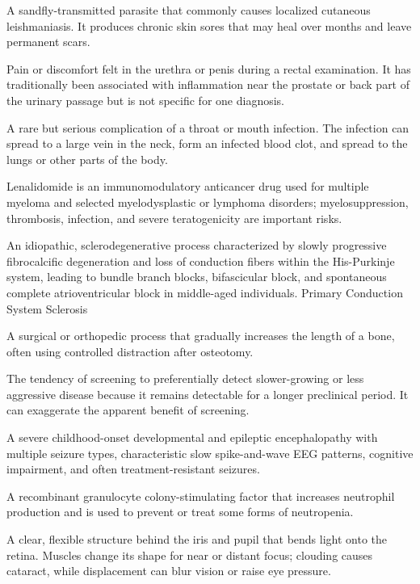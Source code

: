  A sandfly-transmitted parasite that commonly causes localized cutaneous leishmaniasis. It produces chronic skin sores that may heal over months and leave permanent scars.

 Pain or discomfort felt in the urethra or penis during a rectal examination. It has traditionally been associated with inflammation near the prostate or back part of the urinary passage but is not specific for one diagnosis.

 A rare but serious complication of a throat or mouth infection. The infection can spread to a large vein in the neck, form an infected blood clot, and spread to the lungs or other parts of the body.

 Lenalidomide is an immunomodulatory anticancer drug used for multiple myeloma and selected myelodysplastic or lymphoma disorders; myelosuppression, thrombosis, infection, and severe teratogenicity are important risks.

 An idiopathic, sclerodegenerative process characterized by slowly progressive fibrocalcific degeneration and loss of conduction fibers within the His-Purkinje system, leading to bundle branch blocks, bifascicular block, and spontaneous complete atrioventricular block in middle-aged individuals.
\synonyms
Primary Conduction System Sclerosis

 A surgical or orthopedic process that gradually increases the length of a bone, often using controlled distraction after osteotomy.

 The tendency of screening to preferentially detect slower-growing or less aggressive
disease because it remains detectable for a longer preclinical period. It can exaggerate
the apparent benefit of screening.

 A severe childhood-onset developmental and epileptic encephalopathy with multiple seizure types, characteristic slow spike-and-wave EEG patterns, cognitive impairment, and often treatment-resistant seizures.

 A recombinant granulocyte colony-stimulating factor that increases neutrophil production and is used to prevent or treat some forms of neutropenia.

 A clear, flexible structure behind the iris and pupil that bends light onto the retina. Muscles change its shape for near or distant focus; clouding causes cataract, while displacement can blur vision or raise eye pressure.

